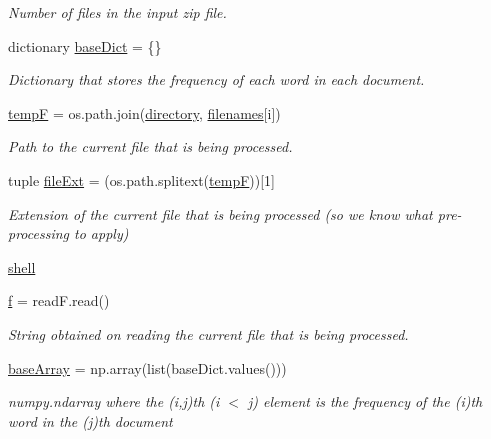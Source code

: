 \begin{DoxyCompactItemize}
\begin{DoxyCompactList}\small\item\em Number of files in the input zip file. \end{DoxyCompactList}\item 
dictionary \hyperlink{namespacemain_back_a522d29412adaea9af5a5f622a084f3d7}{base\+Dict} = \{\}
\begin{DoxyCompactList}\small\item\em Dictionary that stores the frequency of each word in each document. \end{DoxyCompactList}\item 
\hyperlink{namespacemain_back_afe5cb30123edd8f4ce029bd8dc01a015}{tempF} = os.\+path.\+join(\hyperlink{namespacemain_back_a1c89e94124b1c6fedb3a2c9fe2d299c4}{directory}, \hyperlink{namespacemain_back_ac066274638425ed709610bda61383714}{filenames}\mbox{[}i\mbox{]})
\begin{DoxyCompactList}\small\item\em Path to the current file that is being processed. \end{DoxyCompactList}\item 
tuple \hyperlink{namespacemain_back_a9176897b1308459712e81dc0f702d167}{file\+Ext} = (os.\+path.\+splitext(\hyperlink{namespacemain_back_afe5cb30123edd8f4ce029bd8dc01a015}{tempF}))\mbox{[}1\mbox{]}
\begin{DoxyCompactList}\small\item\em Extension of the current file that is being processed (so we know what pre-\/processing to apply) \end{DoxyCompactList}\item 
\hyperlink{namespacemain_back_a30f0d83c5715d2fa96d14b3fd6a7fbd0}{shell}
\item 
\hyperlink{namespacemain_back_a70be22d9dd8cbf946f881a6372fba10a}{f} = read\+F.\+read()
\begin{DoxyCompactList}\small\item\em String obtained on reading the current file that is being processed. \end{DoxyCompactList}\item 
\hyperlink{namespacemain_back_ab3e90b2d4ac29c0647e746d41ea35ec6}{base\+Array} = np.\+array(list(base\+Dict.\+values()))
\begin{DoxyCompactList}\small\item\em numpy.\+ndarray where the (i,j)th (i $<$ j) element is the frequency of the (i)th word in the (j)th document \end{DoxyCompactList}\item 

\end{DoxyCompactItemize}
